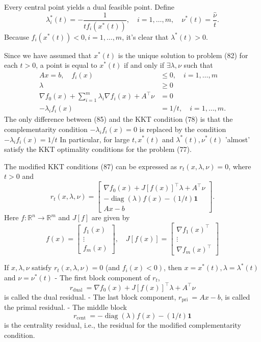 \documentclass{article}
\begin{document}
Every central point yields a dual feasible point.
Define
$$
\lambda_i^*(t)=-\frac{1}{t f_i\left(x^*(t)\right)}, \quad i=1, \ldots, m, \quad \nu^*(t)=\frac{\hat{\nu}}{t} .
$$
Because $f_i\left(x^*(t)\right)<0, i=1, \ldots, m$, it's clear that $\lambda^*(t)>0$.


Since we have assumed that $x^*(t)$ is the unique solution to problem (82) for each $t>0$, a point is equal to $x^*(t)$ if and only if $\exists \lambda, \nu$ such that
$$
\begin{aligned}
A x=b, \quad f_i(x) & \leq 0, \quad i=1, \ldots, m \\
\lambda & \geq 0 \\
\nabla f_0(x)+\sum_{i=1}^m \lambda_i \nabla f_i(x)+A^{\top} \nu & =0 \\
-\lambda_i f_i(x) & =1 / t, \quad i=1, \ldots, m .
\end{aligned}
$$
The only difference between (85) and the KKT condition (78) is that the complementarity condition $-\lambda_i f_i(x)=0$ is replaced by the condition $-\lambda_i f_i(x)=1 / t$
In particular, for large $t, x^*(t)$ and $\lambda^*(t), \nu^*(t)$ 'almost' satisfy the KKT optimality conditions for the problem (77).

The modified $\mathrm{KKT}$ conditions (87) can be expressed as $r_t(x, \lambda, \nu)=0$, where $t>0$ and
$$
r_t(x, \lambda, \nu)=\left[\begin{array}{c}
\nabla f_0(x)+J[f(x)]^{\top} \lambda+A^{\top} \nu \\
-\operatorname{diag}(\lambda) f(x)-(1 / t) \mathbf{1} \\
A x-b
\end{array}\right] .
$$
Here $f: \mathbb{R}^n \rightarrow \mathbb{R}^m$ and $J[f]$ are given by
$$
f(x)=\left[\begin{array}{c}
f_1(x) \\
\vdots \\
f_m(x)
\end{array}\right], \quad J[f(x)]=\left[\begin{array}{c}
\nabla f_1(x)^{\top} \\
\vdots \\
\nabla f_m(x)^{\top}
\end{array}\right]
$$

If $x, \lambda, \nu$ satisfy $r_t(x, \lambda, \nu)=0$ (and $\left.f_i(x)<0\right)$, then $x=x^*(t), \lambda=\lambda^*(t)$ and $\nu=\nu^*(t)$
- The first block component of $r_t$,
$$
r_{\text {dual }}=\nabla f_0(x)+J[f(x)]^{\top} \lambda+A^{\top} \nu
$$
is called the dual residual.
- The last block component, $r_{\text {pri }}=A x-b$, is called the primal residual.
- The middle block
$$
r_{\text {cent }}=-\operatorname{diag}(\lambda) f(x)-(1 / t) \mathbf{1}
$$
is the centrality residual, i.e., the residual for the modified complementarity condition.
\end{document}
